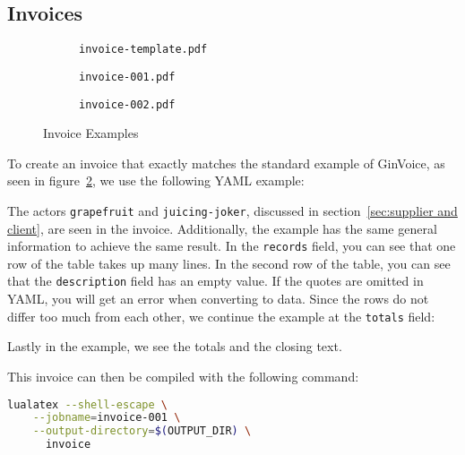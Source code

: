 \subsection{Invoices}
\begin{figure}[!ht]
    \begin{subfigure}{.32\linewidth}
        \caption{\texttt{invoice-template.pdf}}\label{fig:result alt}
    \end{subfigure}\hfill
    \begin{subfigure}{.32\linewidth}
        \caption{\texttt{invoice-001.pdf}}\label{fig:result 1}
    \end{subfigure}\hfill
    \begin{subfigure}{.32\linewidth}
        \caption{\texttt{invoice-002.pdf}}\label{fig:result 2}
    \end{subfigure}
    \caption{Invoice Examples}\label{fig:pdfs}
\end{figure}
\begin{multicols}{2}
    \noindent
    To create an invoice that exactly matches the standard example of GinVoice, as seen in figure~\ref{fig:result 1}, we use the following YAML example:
    
    The actors \texttt{grapefruit} and \texttt{juicing-joker}, discussed in section~\ref{sec:supplier and client}, are seen in the invoice.
Additionally, the example has the same general information to achieve the same result.
In the \texttt{records} field, you can see that one row of the table takes up many lines.
In the second row of the table, you can see that the \texttt{description} field has an empty value.
    \columnbreak
    If the quotes are omitted in YAML, you will get an error when converting to data.
Since the rows do not differ too much from each other, we continue the example at the \texttt{totals} field:
    
    Lastly in the example, we see the totals and the closing text.

    This invoice can then be compiled with the following command:
    \begin{lstlisting}[language=bash]
lualatex --shell-escape \
    --jobname=invoice-001 \
    --output-directory=$(OUTPUT_DIR) \
      invoice
    \end{lstlisting}
\end{multicols}
\twocolumn
